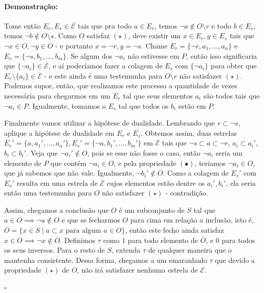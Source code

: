 \documentclass[11pt]{article}
\newcommand{\pulinho}{\vspace{.5cm}}
\theoremstyle{definition}
\theoremstyle{definition}
\theoremstyle{definition}
\theoremstyle{definition}
\theoremstyle{definition}
\theoremstyle{definition}
\theoremstyle{definition}
\theoremstyle{definition}
\theoremstyle{definition}
\theoremstyle{definition}
\theoremstyle{definition}
\theoremstyle{definition}
\newenvironment{prova}{\paragraph{Demonstração:}}{\hfill$\square$ 
\pulinho
}
\theoremstyle{definition}
\theoremstyle{definition}
\begin{document}
\begin{prova}
  Tome então $E_r,E_s \in \overline{\mathcal{E}}$ tais que pra todo $a \in E_r$, temos $\lnot a \notin O \setminus r$ e todo $b \in E_s$, temos $\lnot b \notin O \setminus s$. Como $O$ satisfaz $(\star)$, deve existir um $x \in E_r,y \in E_s$ tais que $\lnot x \in O, \lnot y \in O$ - e portanto $x = \lnot r, y = \lnot s$. Chame $E_r = \{\lnot r, a_1,\dots, a_n\}$ e $E_s = \{\lnot s, b_1, \dots, b_m\}$. Se algum dos $\lnot a_i$ não estivesse em $P$, então isso significaria que $\{\lnot a_i\} \in \overline{\mathcal{E}}$, e aí poderíamos fazer a colagem de $E_r$ com $\{\lnot a_i\}$ para obter que $E_r \setminus \{a_i\} \in \overline{\mathcal{E}}$ - e este ainda é uma testemunha para $O \setminus r$ não satisfazer $(\star)$. Podemos supor, então, que realizamos este processo a quantidade de vezes necessária para chegarmos em um $E_r$ tal que seus elementos $a_i$ são todos tais que $\lnot a_i \in P$. Igualmente, tomamos o $E_s$ tal que todos os $b_i$  estão em $P$.

Finalmente vamos utilizar a hipótese de dualidade. Lembrando que $r \subset \lnot s$, aplique a hipótese de dualidade em $E_r$ e $E_s$. Obtemos assim, duas estrelas $E_r' = \{a,a_1',\dots,a_n'\}, E_s' = \{\lnot a, b_1', \dots, b_m'\}$ em $\overline{\mathcal{E}}$ tais que $\lnot s \subset a \subset \lnot r$, $a_i \subset a_i'$, $b_i \subset b_i'$. Veja que $\lnot a_i' \notin O$, pois se esse não fosse o caso, então $\lnot a_i$ seria um elemento de $P$ que contém $\lnot a_i \in O$, e pela propriedade $(\bullet)$, teriamos $\lnot a_i \in O$, que já sabemos que não vale. Igualmente, $\lnot b_i' \notin O$. Como a colagem de $E_r'$ com $E_s'$ resulta em uma estrela de $\overline{\mathcal{E}}$ cujos elementos estão dentre os $a_i',b_i'$, ela seria então uma testemunha para $O$ não satisfazer $(\star)$ - contradição.

  Assim, chegamos a conclusão que $O$ é um subconjunto de $S$ tal que $a \in O \implies \lnot a \notin O$ e que se fecharmos $O$ para cima em relação a inclusão, isto é, $\overline{O} = \{x \in S \mid a \subset x \text{ para algum } a \in O\}$, então este fecho ainda satisfaz $x \in \overline{O} \implies \lnot x \notin \overline{O}$. Definimos $\tau$ como $1$ para todo elemento de $\overline{O}$, e $0$ para todos os seus inversos. Para o resto de $S$, extenda $\tau$ de qualquer maneira que o mantenha consistente. Dessa forma, chegamos a um emaranhado $\tau$ que devido a propriedade $(\star)$ de $O$, não irá satisfazer nenhuma estrela de $\mathcal{E}$.

\end{prova}
\end{document}
